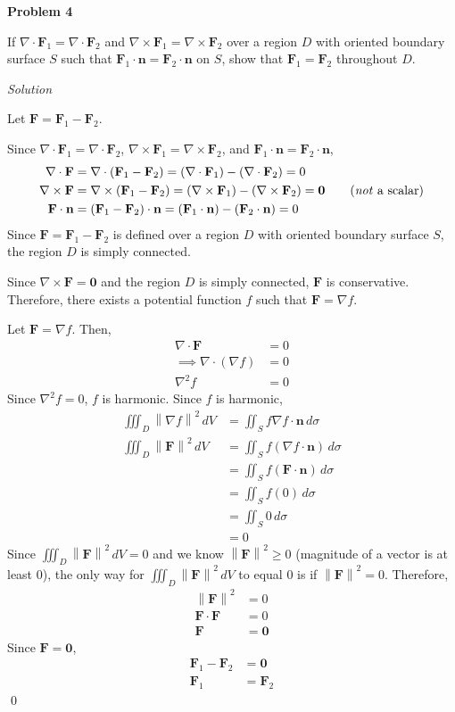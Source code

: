 \documentclass{article}
\newcommand{\lrp}[1]{\left( #1 \right)}
\newcommand{\norm}[1]{\left\lVert #1 \right\rVert}
\newcommand{\F}[0]{\mathbf{F}}
\newcommand{\n}[0]{\mathbf{n}}
\newcommand{\Solution}{\textit{Solution}}
\begin{document}
\newpage
{}
{}\textbf{Problem 4}

If $\nabla \cdot \F_1=\nabla \cdot \F_2$ and $\nabla \times \F_1=\nabla \times \F_2$ over a region $D$ with oriented boundary surface $S$ such that $\F_1\cdot\n=\F_2\cdot\n$ on $S$, show that $\F_1=\F_2$ throughout $D$.

\Solution

Let $\F=\F_1-\F_2$. 

Since $\nabla \cdot \F_1=\nabla \cdot \F_2$, $\nabla \times \F_1=\nabla \times \F_2$, and $\F_1\cdot \n = \F_2\cdot \n$,
\begin{align*}
    \nabla \cdot \F &=\nabla \cdot \lrp{\F_1 - \F_2}= \lrp{\nabla \cdot \F_1}-\lrp{\nabla \cdot \F_2}=0\\
    \nabla \times \F&=\nabla \times\lrp{\F_1-\F_2}=\lrp{\nabla \times \F_1}-\lrp{\nabla \times \F_2}=\mathbf{0}\tag{\textit{not} a scalar}\\
    \F\cdot \n &= \lrp{\F_1-\F_2}\cdot \n=\lrp{\F_1 \cdot \n}-\lrp{\F_2\cdot \n}=0
\end{align*}
Since $\mathbf{F}=\F_1-\F_2$ is defined over a region $D$ with oriented boundary surface $S$, the region $D$ is simply connected. 

Since $\nabla \times \F=\mathbf{0}$ and the region $D$ is simply connected, $\F$ is conservative. Therefore, there exists a potential function $f$ such that $\F=\nabla f$.

Let $\F=\nabla f$. Then,
\begin{align*}
    \nabla \cdot \F &= 0\\
    \implies \nabla \cdot \lrp{\nabla f}&=0\\
    \nabla^2 f &= 0
\end{align*}
Since $\nabla^2 f = 0$, $f$ is harmonic. Since $f$ is harmonic, \begin{align*}
   \iiint_D \norm{\nabla f}^2\,dV &=\iint_S f\nabla f \cdot \n\,d\sigma\tag{see Homework 24, 1(b)}\\
   \iiint_D \norm{\F}^2\,dV&=\iint_S f\lrp{\nabla f \cdot \n}\,d\sigma\tag{$f$ is a scalar function}\\
   &=\iint_S f\lrp{\F\cdot\n}\,d\sigma\\
   &=\iint_S f\lrp{0}\,d\sigma\\
   &=\iint_S 0\,d\sigma\\
   &=0
\end{align*}
Since $\displaystyle \iiint_D \norm{\F}^2\,dV=0$ and we know $\norm{\F}^2\geq 0$ (magnitude of a vector is at least $0$), the only way for $\displaystyle\iiint_D \norm{\F}^2\,dV$ to equal $0$ is if $\norm{\F}^2=0$. Therefore,
\begin{align*}
    \norm{\F}^2 &= 0\\
    \F \cdot \F &= 0\\
    \F &= \mathbf{0}
\end{align*}
Since $\F=\mathbf{0}$,
\begin{align*}
    \F_1 - \F_2 &= \mathbf{0}\\
    \F_1 &= \F_2
\end{align*}
\qed
\end{document}
